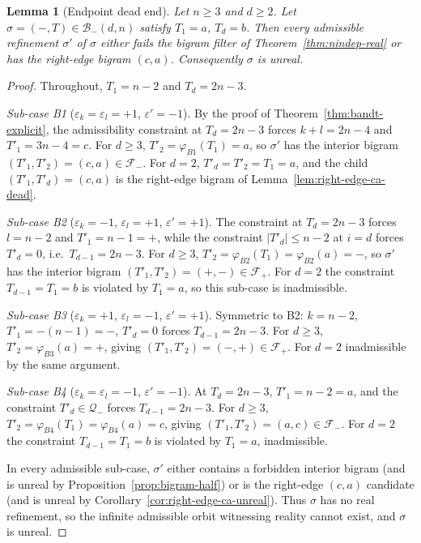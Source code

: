 \documentclass{amsart}
\newtheorem{lemma}[theorem]{Lemma}
\theoremstyle{definition}
\theoremstyle{remark}
\begin{document}
\begin{lemma}[Endpoint dead end]
\label{lem:endpoint-dead}
Let $n \ge 3$ and $d \ge 2$.  Let
$\sigma = (-, T) \in \mathcal{B}_-(d, n)$ satisfy $T_1 = a$,
$T_d = b$.  Then every admissible refinement $\sigma'$ of $\sigma$
either fails the bigram filter of Theorem~\ref{thm:nindep-real}
or has the right-edge bigram $(c, a)$.  Consequently $\sigma$ is
unreal.
\end{lemma}

\begin{proof}
Throughout, $T_1 = n - 2$ and $T_d = 2n - 3$.

\smallskip\noindent\emph{Sub-case B1}
\textup{(}$\varepsilon_k = \varepsilon_l = +1$, $\varepsilon' =
-1$\textup{)}.
By the proof of Theorem~\ref{thm:bandt-explicit}, the
admissibility constraint at $T_d = 2n - 3$ forces $k + l = 2n - 4$
and $T'_1 = 3n - 4 = c$.  For $d \ge 3$, $T'_2 = \varphi_{B1}(T_1)
= a$, so $\sigma'$ has the interior bigram $(T'_1, T'_2) = (c, a)
\in \mathcal{F}_-$.  For $d = 2$, $T'_d = T'_2 = T_1 = a$, and the
child $(T'_1, T'_d) = (c, a)$ is the right-edge bigram of
Lemma~\ref{lem:right-edge-ca-dead}.

\smallskip\noindent\emph{Sub-case B2}
\textup{(}$\varepsilon_k = -1$, $\varepsilon_l = +1$, $\varepsilon'
= +1$\textup{)}.
The constraint at $T_d = 2n - 3$ forces $l = n - 2$ and $T'_1 = n
- 1 = +$, while the constraint $|T'_d| \le n - 2$ at $i = d$
forces $T'_d = 0$, i.e.\ $T_{d-1} = 2n - 3$.  For $d \ge 3$,
$T'_2 = \varphi_{B2}(T_1) = \varphi_{B2}(a) = -$, so $\sigma'$ has
the interior bigram $(T'_1, T'_2) = (+, -) \in \mathcal{F}_+$.
For $d = 2$ the constraint $T_{d-1} = T_1 = b$ is violated by
$T_1 = a$, so this sub-case is inadmissible.

\smallskip\noindent\emph{Sub-case B3}
\textup{(}$\varepsilon_k = +1$, $\varepsilon_l = -1$, $\varepsilon'
= +1$\textup{)}.
Symmetric to B2: $k = n - 2$, $T'_1 = -(n - 1) = -$, $T'_d = 0$
forces $T_{d-1} = 2n - 3$.  For $d \ge 3$, $T'_2 = \varphi_{B3}(a)
= +$, giving $(T'_1, T'_2) = (-, +) \in \mathcal{F}_+$.  For
$d = 2$ inadmissible by the same argument.

\smallskip\noindent\emph{Sub-case B4}
\textup{(}$\varepsilon_k = \varepsilon_l = -1$, $\varepsilon' =
-1$\textup{)}.
At $T_d = 2n - 3$, $T'_1 = n - 2 = a$, and the constraint
$T'_d \in \mathcal{Q}_-$ forces $T_{d-1} = 2n - 3$.  For $d \ge 3$,
$T'_2 = \varphi_{B4}(T_1) = \varphi_{B4}(a) = c$, giving
$(T'_1, T'_2) = (a, c) \in \mathcal{F}_-$.  For $d = 2$ the
constraint $T_{d-1} = T_1 = b$ is violated by $T_1 = a$,
inadmissible.

\smallskip
In every admissible sub-case, $\sigma'$ either contains a
forbidden interior bigram (and is unreal by
Proposition~\ref{prop:bigram-half}) or is the right-edge $(c, a)$
candidate (and is unreal by
Corollary~\ref{cor:right-edge-ca-unreal}).  Thus $\sigma$ has no
real refinement, so the infinite admissible orbit witnessing
reality cannot exist, and $\sigma$ is unreal.
\end{proof}
\end{document}
